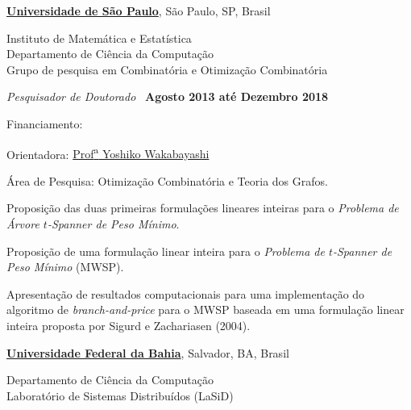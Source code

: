 \documentclass[10pt]{article}
\let\oldcite=\cite
\renewcommand{\cite}[1]{\footnotesize{\textbf{\oldcite{#1}}}\normalsize{}}
\newcommand{\halfblankline}{\quad\vspace{-0.5\baselineskip}\pagebreak[3]}
\begin{document}
\halfblankline


\href{http://www.usp.br}{\textbf{Universidade de S\~{a}o Paulo}},
S\~{a}o Paulo, SP, Brasil
\begin{innerlist}
  \item[] 
    Instituto de Matemática e Estatística\\
    Departamento de Ciência da Computação\\
    Grupo de pesquisa em Combinatória e Otimização Combinatória
\end{innerlist}

\begin{outerlist}

\item[] \textit{Pesquisador de Doutorado}~\cite{Braga2017,Braga2018}%
  \hfill \textbf{Agosto 2013 até Dezembro 2018}
  \begin{innerlist}
    
  \item Financiamento:~\cite{Grant2014}
  \item Orientadora: \href{http://www.ime.usp.br/~yw}%
    {Prof\textsuperscript{a} Yoshiko Wakabayashi}
  \item Área de Pesquisa: Otimização Combinatória e Teoria dos Grafos.
  \item Proposição das duas primeiras formulações lineares inteiras para o \emph{Problema de Árvore $t$-Spanner de Peso Mínimo}.
  \item Proposição de uma formulação linear inteira para o \emph{Problema de $t$-Spanner de Peso Mínimo} (MWSP).
  \item Apresentação de resultados computacionais para uma implementação do algoritmo de \emph{branch-and-price} para o MWSP baseada em uma formulação linear inteira proposta por Sigurd e Zachariasen (2004).  

  \end{innerlist}

\end{outerlist}

\halfblankline

\href{http://www.ufba.br}{\textbf{Universidade Federal da Bahia}},
Salvador, BA, Brasil

\begin{innerlist}
  \item[]
    Departamento de Ciência da Computação\\
    Laboratório de Sistemas Distribuídos (LaSiD)
\end{innerlist}
\end{document}
